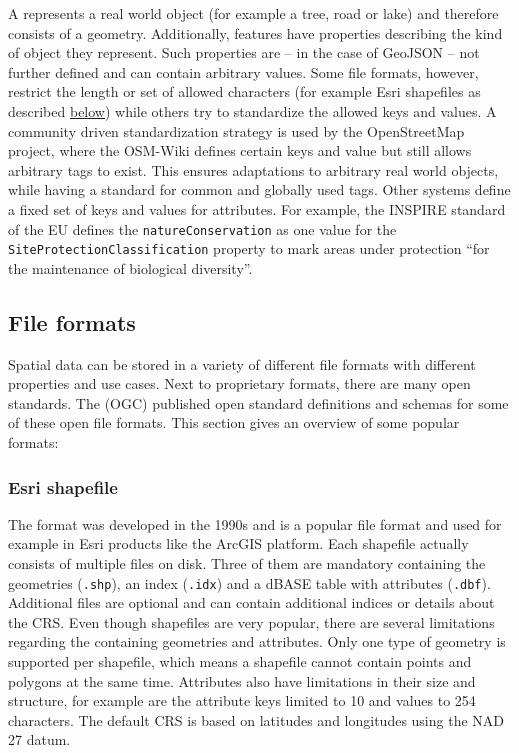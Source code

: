		A  represents a real world object (for example a tree, road or lake) and therefore consists of a geometry.
		Additionally, features have properties describing the kind of object they represent.
		Such properties are -- in the case of GeoJSON -- not further defined and can contain arbitrary values.
		Some file formats, however, restrict the length or set of allowed characters (for example Esri shapefiles as described \hyperref[subsubsec:shapefile]{below}) while others try to standardize the allowed keys and values.
		A community driven standardization strategy is used by the OpenStreetMap project, where the OSM-Wiki defines certain keys and value but still allows arbitrary tags to exist\cite{osm-wiki-proposal-process}.
		This ensures adaptations to arbitrary real world objects, while having a standard for common and globally used tags.
		Other systems define a fixed set of keys and values for attributes.
		For example, the INSPIRE standard of the EU defines the \texttt{natureConservation} as one value for the \texttt{SiteProtectionClassification} property to mark areas under protection \enquote{for the maintenance of biological diversity}\cite[31]{inspire-protected-sites}.
			
	\subsection{File formats}
	\label{subsec:file-formats}
	
		Spatial data can be stored in a variety of different file formats with different properties and use cases.
		Next to proprietary formats, there are many open standards.
		The  (OGC) published open standard definitions and schemas for some of these open file formats.		
		This section gives an overview of some popular formats:
		
		\subsubsection{Esri shapefile}
		\label{subsubsec:shapefile}
		
			The  format was developed in the 1990s and is a popular file format and used for example in Esri products like the ArcGIS platform.
			Each shapefile actually consists of multiple files on disk\cite{esri-shapefile-file-ext-spec}.
			Three of them are mandatory containing the geometries (\texttt{.shp}), an index (\texttt{.idx}) and a dBASE table with attributes (\texttt{.dbf}).
			Additional files are optional and can contain additional indices or details about the CRS.
			Even though shapefiles are very popular\cite[356]{spatial-file-formats-trends}, there are several limitations regarding the containing geometries and attributes.
			Only one type of geometry is supported per shapefile, which means a shapefile cannot contain points and polygons at the same time\cite[4]{esri-shapefile-spec}.
			Attributes also have limitations in their size and structure, for example are the attribute keys limited to 10 and values to 254 characters\cite{esri-shapefile-limitations}.
			The default CRS is based on latitudes and longitudes using the NAD 27 datum\cite{esri-shapefile-coordinate-system}.
			
